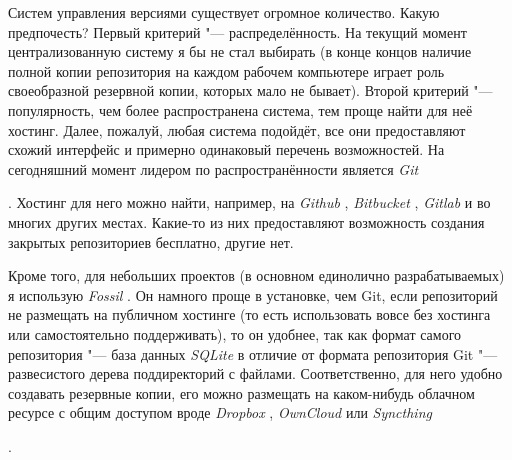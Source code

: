 \documentclass[a4paper,12pt,hyphens]{article}
\newcommand\softname[1]{\textit{#1}}
\begin{document}
Систем управления версиями существует огромное количество. Какую предпочесть?
Первый критерий "--- распределённость. На текущий момент централизованную систему
я бы не стал выбирать (в конце концов наличие полной копии репозитория на каждом
рабочем компьютере играет роль своеобразной резервной копии, которых мало не
бывает). Второй критерий "--- популярность, чем более распространена система, тем проще
найти для неё хостинг. Далее, пожалуй, любая система подойдёт, все они предоставляют
схожий интерфейс и примерно одинаковый перечень возможностей. На сегодняшний момент
лидером по распространённости является \softname{Git} \begin{otherlanguage}{english}\parencite{site-git}\end{otherlanguage}.
Хостинг для него можно найти, например, на \softname{Github} \parencite{site-github},
\softname{Bitbucket} \parencite{site-bitbucket}, \softname{Gitlab} \parencite{site-gitlab}
и во многих других местах. Какие-то из них предоставляют возможность создания закрытых
репозиториев бесплатно, другие нет.

Кроме того, для небольших проектов (в основном единолично разрабатываемых) я использую
\softname{Fossil} \parencite{site-fossil}. Он намного проще в установке, чем Git,
если репозиторий не размещать на публичном хостинге (то есть использовать вовсе без
хостинга или самостоятельно поддерживать), то он удобнее, так как формат самого
репозитория "--- база данных \softname{SQLite} \parencite{site-sqlite} в отличие от
формата репозитория Git "--- развесистого дерева поддиректорий с файлами. Соответственно,
для него удобно создавать резервные копии, его можно размещать на каком-нибудь облачном
ресурсе с общим доступом вроде \softname{Dropbox} \parencite{site-dropbox},
\softname{OwnCloud} \parencite{site-owncloud} или \softname{Syncthing}
\begin{otherlanguage}{english}\parencite{site-syncthing}\end{otherlanguage}.
\end{document}
